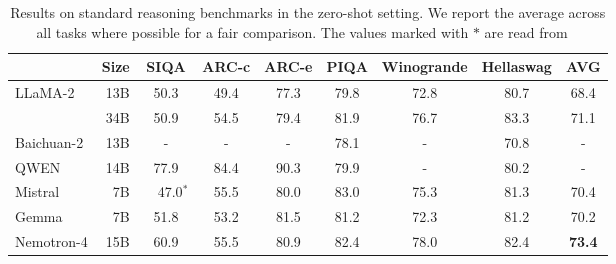 \documentclass[11pt]{article}
\newcommand{\ours}{Nemotron-4}
\begin{document}
\begin{table}[H]
\centering
\begin{adjustbox}{max width=\textwidth, scale=1.0}
\begin{tabular}{lrccccccc}
\toprule
& Size & SIQA  & ARC-c & ARC-e & PIQA & Winogrande & Hellaswag & AVG \\ 
\midrule
\multirow{2}{*}{LLaMA-2} & 13B & 50.3 & 49.4 & 77.3 & 79.8 & 72.8 & 80.7 & 68.4 \\
& 34B & 50.9 & 54.5 & 79.4 & 81.9 & 76.7 & 83.3 & 71.1 \\
\midrule
\multirow{1}{*}{Baichuan-2} & 13B & - & - & - & 78.1 & - & 70.8 & - \\
\midrule
QWEN & 14B & 77.9 & 84.4 &90.3 & 79.9 & - & 80.2 & - \\
\midrule
Mistral  & 7B & \ \ 47.0$^{*}$ & 55.5 &80.0 & 83.0 & 75.3 & 81.3 & 70.4 \\
\midrule
Gemma & 7B & 51.8 & 53.2 & 81.5 & 81.2 & 72.3 & 81.2 & 70.2 \\
\midrule
\ours{} & 15B & 60.9 & 55.5 & 80.9 & 82.4 & 78.0 & 82.4 & \textbf{73.4} \\
\bottomrule
\end{tabular}
\end{adjustbox}
\caption{\label{tab:lm_eval_harness_external} Results on standard reasoning benchmarks in the zero-shot setting. We report the average across all tasks where possible for a fair comparison. The values marked with $*$ are read from ~\citet{gemma24} }
\end{table}
\end{document}
